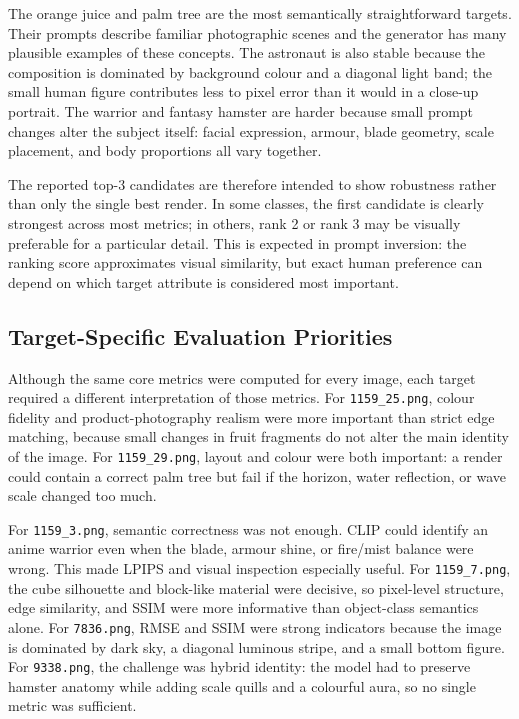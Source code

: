 \documentclass[runningheads]{llncs}
\newcommand{\imgpath}[1]{\texttt{#1}}
\begin{document}
The orange juice and palm tree are the most semantically straightforward targets. Their prompts describe familiar photographic scenes and the generator has many plausible examples of these concepts. The astronaut is also stable because the composition is dominated by background colour and a diagonal light band; the small human figure contributes less to pixel error than it would in a close-up portrait. The warrior and fantasy hamster are harder because small prompt changes alter the subject itself: facial expression, armour, blade geometry, scale placement, and body proportions all vary together.

The reported top-3 candidates are therefore intended to show robustness rather than only the single best render. In some classes, the first candidate is clearly strongest across most metrics; in others, rank 2 or rank 3 may be visually preferable for a particular detail. This is expected in prompt inversion: the ranking score approximates visual similarity, but exact human preference can depend on which target attribute is considered most important.

\subsection{Target-Specific Evaluation Priorities}

Although the same core metrics were computed for every image, each target required a different interpretation of those metrics. For \imgpath{1159\_25.png}, colour fidelity and product-photography realism were more important than strict edge matching, because small changes in fruit fragments do not alter the main identity of the image. For \imgpath{1159\_29.png}, layout and colour were both important: a render could contain a correct palm tree but fail if the horizon, water reflection, or wave scale changed too much.

For \imgpath{1159\_3.png}, semantic correctness was not enough. CLIP could identify an anime warrior even when the blade, armour shine, or fire/mist balance were wrong. This made LPIPS and visual inspection especially useful. For \imgpath{1159\_7.png}, the cube silhouette and block-like material were decisive, so pixel-level structure, edge similarity, and SSIM were more informative than object-class semantics alone. For \imgpath{7836.png}, RMSE and SSIM were strong indicators because the image is dominated by dark sky, a diagonal luminous stripe, and a small bottom figure. For \imgpath{9338.png}, the challenge was hybrid identity: the model had to preserve hamster anatomy while adding scale quills and a colourful aura, so no single metric was sufficient.
\end{document}
